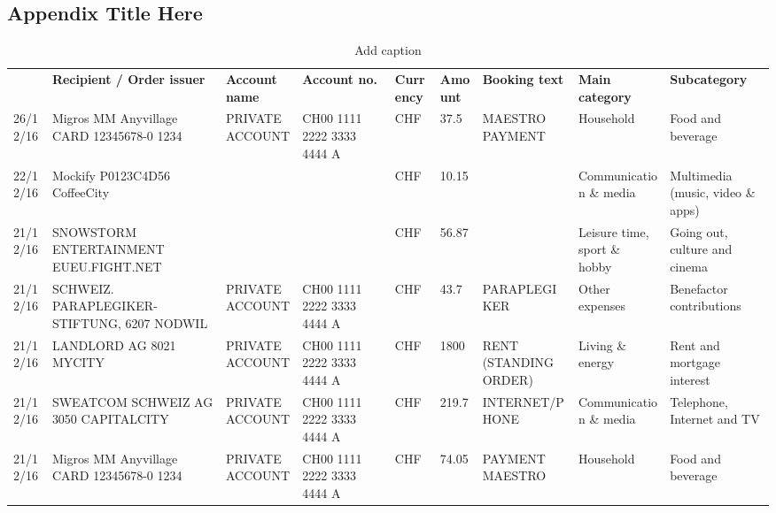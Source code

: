 
\begin{landscape}

\chapter{Appendix Title Here} %

\label{AppendixA} %


\begin{table}[t]
	\begin{center}
	\caption{Add caption}
	\begin{tabular}{lllllllll}
		\rowcolor[rgb]{ .859,  .859,  .859} \multicolumn{1}{l}{\textbf{Date}} & \textbf{Recipient / Order issuer} & \textbf{Account name} & \textbf{Account no.} & \textbf{Currency} & \multicolumn{1}{l}{\textbf{Amount}} & \textbf{Booking text} & \textbf{Main category} & \textbf{Subcategory} \\
		26/12/16 & Migros MM Anyvillage CARD 12345678-0 1234 & PRIVATE ACCOUNT & CH00 1111 2222 3333 4444 A & CHF   & 37.5  & MAESTRO PAYMENT & Household & Food and beverage \\
		22/12/16 & Mockify P0123C4D56       CoffeeCity &       &       & CHF   & 10.15 &       & Communication \& media & Multimedia (music, video \& apps) \\
		21/12/16 & SNOWSTORM ENTERTAINMENT EUEU.FIGHT.NET &       &       & CHF   & 56.87 &       & Leisure time, sport \& hobby & Going out, culture and cinema \\
		21/12/16 & SCHWEIZ. PARAPLEGIKER- STIFTUNG, 6207 NODWIL & PRIVATE ACCOUNT & CH00 1111 2222 3333 4444 A & CHF   & 43.7  & PARAPLEGIKER & Other expenses & Benefactor contributions \\
		21/12/16 & LANDLORD AG 8021 MYCITY & PRIVATE ACCOUNT & CH00 1111 2222 3333 4444 A & CHF   & 1800  & RENT (STANDING ORDER) & Living \& energy & Rent and mortgage interest \\
		21/12/16 & SWEATCOM SCHWEIZ AG 3050 CAPITALCITY & PRIVATE ACCOUNT & CH00 1111 2222 3333 4444 A & CHF   & 219.7 & INTERNET/PHONE & Communication \& media & Telephone,  Internet and TV \\
		21/12/16 & Migros MM Anyvillage CARD 12345678-0 1234 & PRIVATE ACCOUNT & CH00 1111 2222 3333 4444 A & CHF   & 74.05 & PAYMENT MAESTRO & Household & Food and beverage \\

\end{tabular}
\end{center}
\end{table}
\end{landscape}
